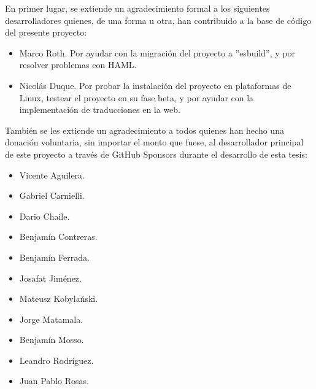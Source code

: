 En primer lugar, se extiende un agradecimiento formal a los siguientes desarrolladores quienes, de una forma u otra, han contribuido a la base de código del presente proyecto:
\begin{itemize}
	\item Marco Roth. Por ayudar con la migración del proyecto a ''esbuild'', y por resolver problemas con HAML.
	\item Nicolás Duque. Por probar la instalación del proyecto en plataformas de Linux, testear el proyecto en su fase beta, y por ayudar con la implementación de traducciones en la web.
\end{itemize}

También se les extiende un agradecimiento a todos quienes han hecho una donación voluntaria, sin importar el monto que fuese, al desarrollador principal de este proyecto a través de GitHub Sponsors durante el desarrollo de esta tesis:
\begin{itemize}
	\item Vicente Aguilera.
	\item Gabriel Carnielli.
	\item Dario Chaile.
	\item Benjamín Contreras.
	\item Benjamín Ferrada.
	\item Josafat Jiménez.
	\item  Mateusz Kobylański.
	\item Jorge Matamala.
	\item Benjamín Mosso.
	\item Leandro Rodríguez.
	\item Juan Pablo Rosas.
\end{itemize}
